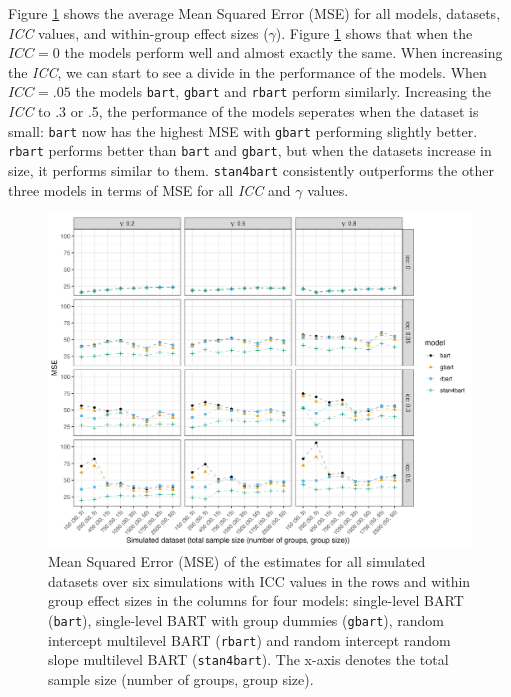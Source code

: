 \documentclass[10pt, a4paper, titlepage]{article}
\begin{document}
Figure \ref{fig:mseplots} shows the average Mean Squared Error (MSE) for all models, datasets, \textit{ICC} values, and within-group effect sizes ($\gamma$). Figure \ref{fig:mseplots} shows that when the $ICC = 0$ the models perform well and almost exactly the same. When increasing the \textit{ICC}, we can start to see a divide in the performance of the models. When $ICC = .05$ the models \texttt{bart}, \texttt{gbart} and \texttt{rbart} perform similarly. Increasing the \textit{ICC} to .3 or .5, the performance of the models seperates when the dataset is small: \texttt{bart} now has the highest MSE with \texttt{gbart} performing slightly better. \texttt{rbart} performs better than \texttt{bart} and \texttt{gbart}, but when the datasets increase in size, it performs similar to them. \texttt{stan4bart} consistently outperforms the other three models in terms of MSE for all \textit{ICC} and $\gamma$ values.

\begin{figure}[H]
\caption{Mean Squared Error (MSE) of the estimates for all simulated datasets over six simulations with ICC values in the rows and within group effect sizes in the columns for four models: single-level BART (\texttt{bart}), single-level BART with group dummies (\texttt{gbart}), random intercept multilevel BART (\texttt{rbart}) and random intercept random slope multilevel BART (\texttt{stan4bart}). The x-axis denotes the total sample size (number of groups, group size).}
\centering
\label{fig:mseplots}
\includegraphics[width=\textwidth]{mseplot.png}
\end{figure}
\end{document}
